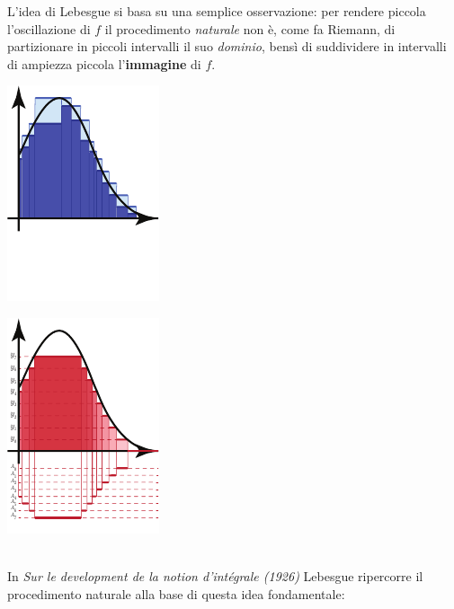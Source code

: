 L’idea di Lebesgue si basa su una semplice osservazione: per rendere piccola l’oscillazione di $f$ il procedimento \textit{naturale} non è, come fa Riemann, di partizionare in piccoli intervalli il suo \textit{dominio}, bensì di suddividere in intervalli
di ampiezza piccola l’\textbf{immagine} di $f$.\\
\begin{minipage}{0.5\textwidth}
	\begin{center}
		\includegraphics[trim=0cm 0cm 0cm 0cm, clip, scale=1.6]{images/lebesgueriemann1}
	\end{center}
\end{minipage}
\begin{minipage}{0.5\textwidth}
	\begin{center}
		\includegraphics[trim=0cm 0cm 0cm 0cm, clip, scale=1.6]{images/lebesgueriemann2}
	\end{center}
\end{minipage}\\%
In \textit{Sur le development de la notion d'intégrale (1926)} Lebesgue ripercorre il procedimento naturale alla base di questa idea fondamentale:
